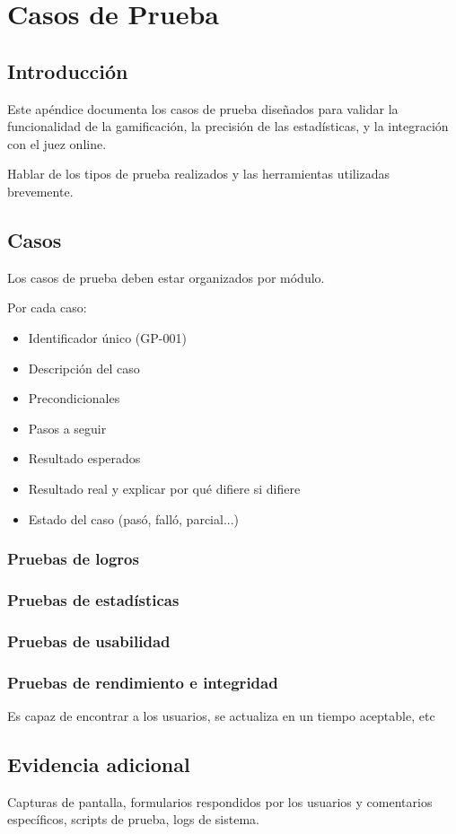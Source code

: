 \chapter{Casos de Prueba}
\label{cap:casosDePrueba}

\section{Introducción}
Este apéndice documenta los casos de prueba diseñados para validar la funcionalidad de la gamificación, la precisión de las estadísticas, y la integración con el juez online.

Hablar de los tipos de prueba realizados y las herramientas utilizadas brevemente.

\section{Casos}
Los casos de prueba deben estar organizados por módulo.

Por cada caso:
\begin{itemize}
    \item Identificador único (GP-001)
    \item Descripción del caso
    \item Precondicionales
    \item Pasos a seguir
    \item Resultado esperados
    \item Resultado real y explicar por qué difiere si difiere
    \item Estado del caso (pasó, falló, parcial...)
\end{itemize}

\subsection{Pruebas de logros}
\subsection{Pruebas de estadísticas}
\subsection{Pruebas de usabilidad}
\subsection{Pruebas de rendimiento e integridad}
Es capaz de encontrar a los usuarios, se actualiza en un tiempo aceptable, etc

\section{Evidencia adicional}
Capturas de pantalla, formularios respondidos por los usuarios y comentarios específicos, scripts de prueba, logs de sistema.